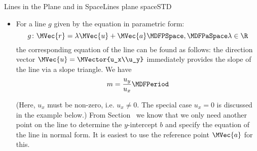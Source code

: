 \begin{MXContent}{Lines in the Plane and in Space}{Lines plane space}{STD}
\begin{MInfo}
\begin{itemize}
$\MVector{x\\m x+b}=x\MVector{1\\m}+\MVector{0\\b}$. Then, the vector form of the equation of a line is
\[
 g\colon \MVec{r}=x\MVector{1\\m}+\MVector{0\\b}\MDFPSpace,\MDFPaSpace x\in\R 
\]
with the direction vector $\MVec{u}=\MVector{1\\m}$ and the reference vector $\MVec{a}=\MVector{0\\b}$.
\item For a line $g$ given by the equation in parametric form:
\[
 g\colon \MVec{r}=\lambda\MVec{u}+\MVec{a}\MDFPSpace,\MDFPaSpace\lambda\in\R
\]
the corresponding equation of the line can be found as follows: the direction vector $\MVec{u}=\MVector{u_x\\u_y}$
immediately provides the slope of the line via a slope triangle. We have
\[
 m=\frac{u_y}{u_x} \MDFPeriod
\]
\begin{center}
\end{center}
(Here, $u_x$ must be non-zero, i.e. $u_x\neq 0$. The special case $u_x=0$ is discussed in the example below.)
From Section~ we know that we only need another point on the line to 
determine the $y$-intercept $b$ and specify the equation of the line in normal form. It is easiest to use the  
reference point $\MVec{a}$ for this.
\end{itemize}


\end{MInfo}
\end{MXContent}
